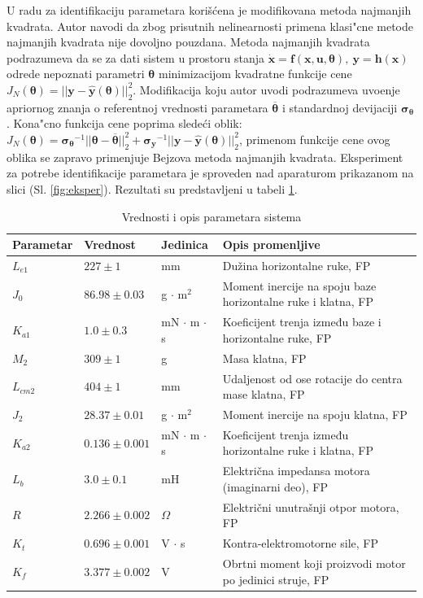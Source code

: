 \documentclass[a4paper,11pt]{article}
\theoremstyle{definition} \newtheorem{deff}{Definicija}[section]
\theoremstyle{definition} \newtheorem{prim}[deff]{Primer}
\theoremstyle{plain} \newtheorem{teor}[deff]{Teorema}
\newcommand{\vect}[1]{\boldsymbol{\mathbf{#1}}}
\begin{document}
	U radu \cite{inicijalna} za identifikaciju parametara korišćena je modifikovana metoda najmanjih kvadrata. Autor navodi da zbog prisutnih nelinearnosti primena klasi"cne metode najmanjih kvadrata nije dovoljno pouzdana. Metoda najmanjih kvadrata podrazumeva da se za dati sistem u prostoru stanja $\dot{\mathbf{x}} = \mathbf{f}(\mathbf{x}, \mathbf{u}, \vect{\theta}),~ \mathbf{y} = \mathbf{h}(\mathbf{x})$ odrede nepoznati parametri $\vect{\theta}$ minimizacijom kvadratne funkcije cene $J_N(\vect{\theta}) = ||\mathbf{y}-\hat{\mathbf{y}}(\vect{\theta})||^2_2$. Modifikacija koju autor uvodi podrazumeva uvo\dj enje apriornog znanja o referentnoj vrednosti parametara $\vect{\overline{\theta}}$ i standardnoj devijaciji $\vect{\sigma_{\vect{\theta}}}$. Kona"cno funkcija cene poprima slede\'ci oblik: $J_N(\vect{\theta}) = \vect{\sigma_{\vect{\theta}}}^{-1}||\vect{\theta}-\vect{\overline{\theta}}||^2_2 +  \vect{\sigma_{\vect{y}}}^{-1}||\mathbf{y}-\hat{\mathbf{y}}(\vect{\theta})||^2_2$, primenom funkcije cene ovog oblika se zapravo primenjuje Bejzova metoda najmanjih kvadrata. Eksperiment za potrebe identifikacije parametara je sproveden nad aparaturom prikazanom na slici (Sl. \ref{fig:eksper}). Rezultati su predstavljeni u  tabeli \ref{tab:tab1}.
	
	\begin{table}[ht]
		\centering
		\caption{Vrednosti i opis parametara sistema}
		\begin{tabular}{l l l l}
			\toprule
			Parametar & Vrednost & Jedinica & Opis promenljive \\
			\midrule
			$L_{e1}$ & $227 \pm 1$ & mm & Dužina horizontalne ruke, FP \\
			$J_0$ & $86.98 \pm 0.03$ & g $\cdot$ m$^2$ & Moment inercije na spoju baze horizontalne ruke i klatna, FP \\
			$K_{a1}$ & $1.0 \pm 0.3$ & mN $\cdot$ m $\cdot$ s & Koeficijent trenja između baze i horizontalne ruke, FP \\
			$M_2$ & $309 \pm 1$ & g & Masa klatna, FP \\
			$L_{cm2}$ & $404 \pm 1$ & mm & Udaljenost od ose rotacije do centra mase klatna, FP \\
			$J_2$ & $28.37 \pm 0.01$ & g $\cdot$ m$^2$ & Moment inercije na spoju klatna, FP \\
			$K_{a2}$ & $0.136 \pm 0.001$ & mN $\cdot$ m $\cdot$ s & Koeficijent trenja između horizontalne ruke i klatna, FP \\
			$L_b$ & $3.0 \pm 0.1$ & mH & Električna impedansa motora (imaginarni deo), FP \\
			$R$ & $2.266 \pm 0.002$ & $\Omega$ & Električni unutrašnji otpor motora, FP \\
			$K_t$ & $0.696 \pm 0.001$ & V $\cdot$ s & Kontra-elektromotorne sile, FP \\
			$K_f$ & $3.377 \pm 0.002$ & V & Obrtni moment koji proizvodi motor po jedinici struje, FP \\
			\bottomrule
		\end{tabular}
		\label{tab:tab1}
	\end{table}
	
\end{document}
